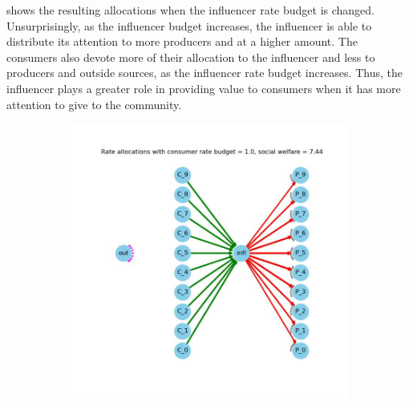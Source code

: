 \documentclass[11pt, letterpaper]{article}
\begin{document}
 shows the resulting allocations when the influencer rate budget is changed. Unsurprisingly, as the influencer budget increases, the influencer is able to distribute its attention to more producers and at a higher amount. The consumers also devote more of their allocation to the influencer and less to producers and outside sources, as the influencer rate budget increases. Thus, the influencer plays a greater role in providing value to consumers when it has more attention to give to the community.

\begin{figure}[h]
\centering
\begin{adjustbox}{max width=1.5\textwidth,center}
    \begin{subfigure}[b]{0.4\textwidth}
        \includegraphics[width=\linewidth]{"figures/M/1.0_allocs.jpg"}
    \end{subfigure}
    \begin{subfigure}[b]{0.4\textwidth}

\end{subfigure}
\end{adjustbox}
\end{figure}
\end{document}
